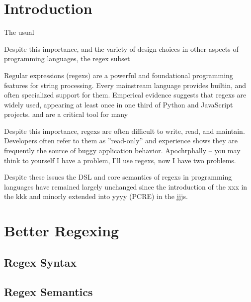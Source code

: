 \documentclass[sigplan,10pt,review]{acmart}
\begin{document}


\maketitle

\cite{bosque}

\section{Introduction}
The usual

Despite this importance, and the variety of design choices in other aspects of programming languages, the regex 
subset  


  Regular expressions (regexs) are a powerful and foundational programming features for string processing. Every mainstream language provides 
builtin, and often specialized support for them. Emperical evidence suggests that regexs are widely used, appearing at least once in 
one third of Python and JavaScript projects.  and are a critical tool for many

Despite this importance, regexs are often difficult to write, read, and maintain. Developers often refer to them as ''read-only'' and 
experience shows they are frequently the source of buggy application behavior. 
Apochrphally -- you may think to yourself I have a problem, I'll use regexs, now I have two problems. 

Despite these issues the DSL and core semantics of regexs in programming languages have remained largely unchanged since the 
introduction of the xxx in the kkk and minorly extended into yyyy (PCRE) in the jjjs.

\section{Better Regexing}

\subsection{Regex Syntax}

\subsection{Regex Semantics}
\end{document}

